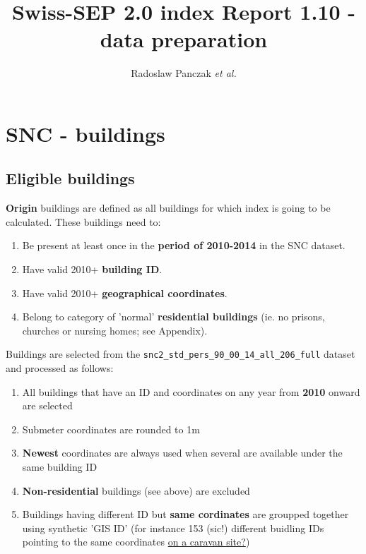 \documentclass[a4paper, notitlepage, fleqn]{article} %
\title{\textbf{Swiss-SEP 2.0 index \endgraf 
Report 1.10 - data preparation}}
\author{Radoslaw Panczak \textit{et al.}}
\begin{document}
\maketitle
\tableofcontents

\newpage
\section{SNC - buildings}
\subsection{Eligible buildings}

\textbf{Origin} buildings are defined as all buildings for which index 
is going to be calculated. These buildings need to:

\begin{enumerate}

	\item Be present at least once in the \textbf{period of 2010-2014} in the SNC dataset.
	\item Have valid 2010+ \textbf{building ID}.
	\item Have valid 2010+ \textbf{geographical coordinates}.
	\item Belong to category of 'normal' \textbf{residential buildings} (ie. no prisons, churches or nursing homes; see Appendix).
	
\end{enumerate}
	
Buildings are selected from the \texttt{snc2\_std\_pers\_90\_00\_14\_all\_206\_full} dataset 
and processed as follows:
	
\begin{enumerate}

	\item All buildings that have an ID and coordinates on any year from \textbf{2010} onward are selected
		
	\item Submeter coordinates are rounded to 1m
		
	\item \textbf{Newest} coordinates are always used when several are available under the same building ID
	
	\item \textbf{Non-residential} buildings (see above) are excluded
	
	\item Buildings having different ID but \textbf{same cordinates} are groupped together using synthetic 'GIS ID'
		(for instance 153 (sic!) different buidling IDs pointing to the same coordinates \href{https://goo.gl/maps/eC8fDZtEboP2}{on a caravan site?})
		
\end{enumerate}
\end{document}
